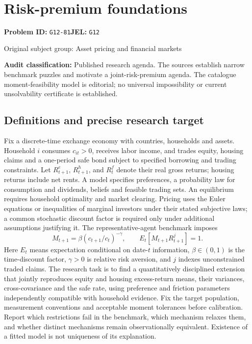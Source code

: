 \documentclass[11pt,a4paper]{article}
\begin{document}
\section*{Risk-premium foundations}
\textbf{Problem ID:} \texttt{G12-81}\quad \textbf{JEL:} \texttt{G12}\par
\label{problem:OP-0310}
\label{audited:ECON-024}
{\sffamily\small\color{muted}Original subject group: Asset pricing and financial markets\par}
\label{definitions:problem:30007592}
\textbf{Audit classification:} Published research agenda. The sources establish narrow benchmark puzzles and motivate a joint-risk-premium agenda. The catalogue moment-feasibility model is editorial; no universal impossibility or current unsolvability certificate is established.
\subsection*{Definitions and precise research target}
Fix a discrete-time exchange economy with countries, households and assets. Household \(i\) consumes \(c_{it}>0\), receives labor income, and trades equity, housing claims and a one-period safe bond subject to specified borrowing and trading constraints. Let \(R^e_{t+1}\), \(R^h_{t+1}\), and \(R^f_t\) denote their real gross returns; housing returns include net rents. A model specifies preferences, a probability law for consumption and dividends, beliefs and feasible trading sets. An equilibrium requires household optimality and market clearing. Pricing uses the Euler equations or inequalities of marginal investors under their stated subjective laws; a common stochastic discount factor is required only under additional assumptions justifying it. The representative-agent benchmark imposes
\[M_{t+1}=\beta(c_{t+1}/c_t)^{-\gamma},\qquad E_t[M_{t+1}R^j_{t+1}]=1.\]
Here \(E_t\) means expectation conditional on date-\(t\) information, \(\beta\in(0,1)\) is the time-discount factor, \(\gamma>0\) is relative risk aversion, and \(j\) indexes unconstrained traded claims. The research task is to find a quantitatively disciplined extension that jointly reproduces equity and housing excess-return means, their variances, cross-covariance and the safe rate, using preference and friction parameters independently compatible with household evidence. Fix the target population, measurement conventions and acceptable moment tolerances before calibration. Report which restrictions fail in the benchmark, which mechanism relaxes them, and whether distinct mechanisms remain observationally equivalent. Existence of a fitted model is not uniqueness of its explanation.
\end{document}
